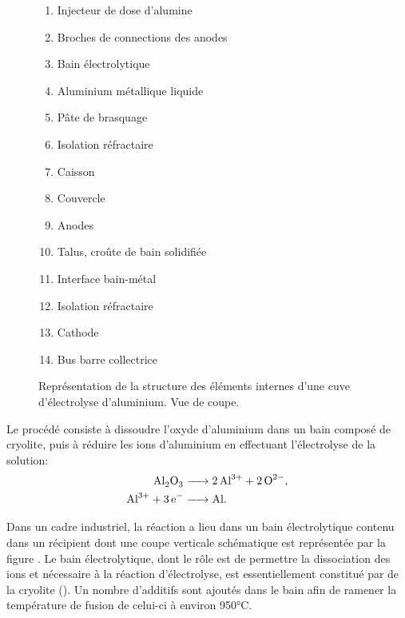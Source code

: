 
\begin{figure}[t]
\begin{center}
  
  \begin{multicols}{2}
    \small
    \begin{enumerate}[label=(\alph*)]
    \item Injecteur de dose d'alumine
    \item Broches de connections des anodes
    \item Bain électrolytique
    \item Aluminium métallique liquide
    \item Pâte de brasquage
    \item Isolation réfractaire
    \item Caisson
    \item Couvercle
    \item Anodes
    \item Talus, croûte de bain solidifiée
    \item Interface bain-métal
    \item Isolation réfractaire
    \item Cathode
    \item Bus barre collectrice
    \end{enumerate}
  \end{multicols}
  \caption{Représentation de la structure des éléments internes
    d'une cuve d'électrolyse d'aluminium. Vue de coupe.}
  \label{fig:electrolysis-pot}
\end{center}
\end{figure}

Le procédé consiste à dissoudre l'oxyde d'aluminium dans un bain
composé de cryolite, puis à réduire les ions d'aluminium en effectuant
l'électrolyse de la solution:
\begin{align}
  \cee{Al2O3 &-> 2Al^{3+} + 2O^{2-}},\label{reac:dissociation}\\
  \cee{Al^{3+} + 3e^{-} &-> Al}.\label{reac:electrolysis}
\end{align}

Dans un cadre industriel, la réaction a lieu dans un bain
électrolytique contenu dans un récipient dont
une coupe verticale schématique est représentée par la figure
. Le bain électrolytique, dont le rôle est de permettre
la dissociation des ions  et  nécessaire à
la réaction d'électrolyse, est essentiellement constitué par de la
cryolite (). Un nombre d'additifs sont ajoutés dans le
bain afin de ramener la température de fusion de celui-ci à environ
\num{950}\si\celsius.

